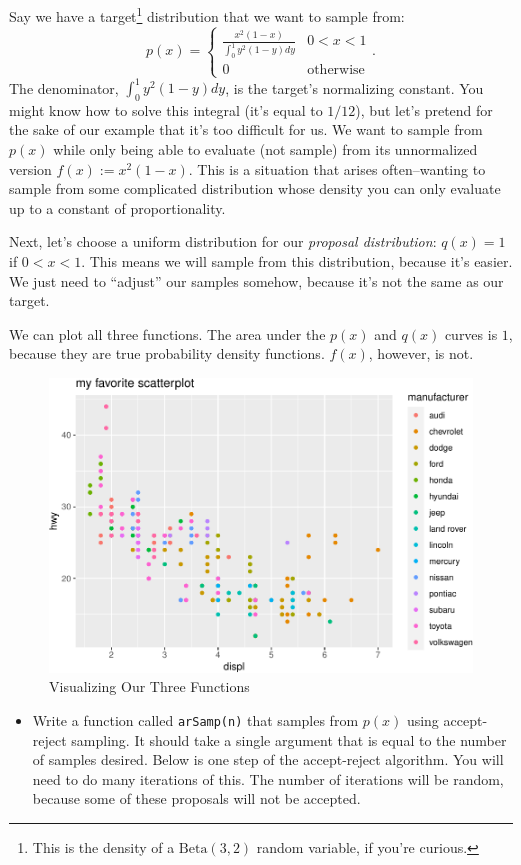\documentclass[
  12pt,
  krantz2]{krantz}
\providecommand{\tightlist}{%
  \setlength{\itemsep}{0pt}\setlength{\parskip}{0pt}}
\begin{document}
Say we have a target\footnote{This is the density of a \(\text{Beta}(3,2)\) random variable, if you're curious.} distribution that we want to sample from:
\[
p(x) = 
\begin{cases}
\frac{x^2(1-x)}{\int_0^1 y^2(1-y) dy} & 0 < x < 1 \\
0 & \text{otherwise}
\end{cases}.
\]
The denominator, \(\int_0^1 y^2(1-y) dy\), is the target's normalizing constant. You might know how to solve this integral (it's equal to \(1/12\)), but let's pretend for the sake of our example that it's too difficult for us. We want to sample from \(p(x)\) while only being able to evaluate (not sample) from its unnormalized version \(f(x) := x^2(1-x)\). This is a situation that arises often--wanting to sample from some complicated distribution whose density you can only evaluate up to a constant of proportionality.

Next, let's choose a uniform distribution for our \emph{proposal distribution}: \(q(x) = 1\) if \(0 < x < 1\). This means we will sample from this distribution, because it's easier. We just need to ``adjust'' our samples somehow, because it's not the same as our target.

We can plot all three functions. The area under the \(p(x)\) and \(q(x)\) curves is \(1\), because they are true probability density functions. \(f(x)\), however, is not.

\begin{figure}

{\centering \includegraphics[width=0.4\linewidth]{r_and_python_book_files/figure-latex/unnamed-chunk-186-1} 

}

\caption{Visualizing Our Three Functions}\label{fig:unnamed-chunk-186}
\end{figure}

\begin{itemize}
\tightlist
\item
  Write a function called \texttt{arSamp(n)} that samples from \(p(x)\) using accept-reject sampling. It should take a single argument that is equal to the number of samples desired. Below is one step of the accept-reject algorithm. You will need to do many iterations of this. The number of iterations will be random, because some of these proposals will not be accepted.
\end{itemize}
\end{document}
